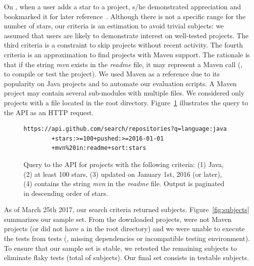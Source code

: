 On \github{}, when a user adds a star to a project, s/he demonstrated
appreciation and bookmarked it for later
reference~\cite{github-stars}.  Although there is not a specific range
for the number of stars, our criteria is an estimation to avoid
trivial subjects: we assumed that \github{} users are likely to
demonstrate interest on well-tested projects. The third criteria is a
constraint to skip projects without recent activity. The fourth
criteria is an approximation to find projects with Maven support. The
rationale is that if the string \emph{mvn} exists in the \emph{readme}
file, it may represent a Maven call (\eg, to compile or test the
project). We used Maven as a reference due to its popularity on Java
projects and to automate our evaluation scripts. A Maven project may
contain several sub-modules with multiple \pomf{} files. We considered
only projects with a \pomf{} file located in the root directory.
Figure~\ref{fig:subject-query} illustrates the query to the \github{}
API as an HTTP request.

\begin{figure}[h!]
\centering
\scriptsize
{}
\begin{lstlisting}
https://api.github.com/search/repositories?q=language:java
        +stars:>=100+pushed:>=2016-01-01
        +mvn%20in:readme+sort:stars
\end{lstlisting}
    \caption{\label{fig:subject-query} Query to the \github{} API for
    projects with the following criteria: (1) Java, (2) at least 100
    stars, (3) updated on January 1st, 2016 (or later), (4) contains
    the string \emph{mvn} in the \emph{readme} file. Output is
    paginated in descending order of stars.}
\end{figure}

As of March 25th 2017, our search criteria returned \SubjectsGithub{}
subjects. Figure~\ref{fig:subjects} summarizes our sample set. From
the \SubjectsGithub{} downloaded projects, \SubjectsGithubNotMaven{}
were not Maven projects (or did not have a \pomf{} in the root
directory) and we were unable to execute the tests from
\SubjectsGithubNotTestable{} tests (\eg, missing dependencies or
incompatible testing environment). To ensure that our sample set is
stable, we retested the remaining subjects to eliminate flaky tests
(total of \SubjectsGithubFlaky{} subjects). Our final set consists in
\numSubjs{} testable subjects.

